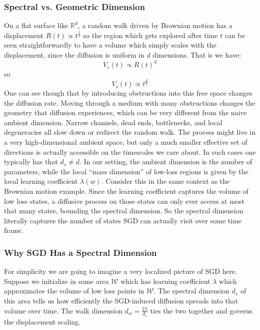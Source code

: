 \documentclass{article} %
\theoremstyle{definition}
\begin{document}
\subsubsection{Spectral vs. Geometric Dimension}
On a flat surface like $\mathbb{R}^d$, a random walk driven by Brownian motion has a displacement $R(t) \propto t^{\frac{1}{2}}$ so the region which gets explored after time $t$ can be seen straightforwardly to have a volume which simply scales with the displacement, since the diffusion is uniform in $d$ dimensions. That is we have:
\begin{equation}
    V_s(t) \propto R(t)^d
\end{equation}
so
\begin{equation}
    V_s(t) \propto t^{\frac{d}{2}}
\end{equation}
One can see though that by introducing obstructions into this free space changes the diffusion rate. Moving through a medium with many obstructions changes the geometry that diffusion experiences, which can be very different from the naive ambient dimension. Narrow channels, dead ends, bottlenecks, and local degeneracies all slow down or redirect the random walk. The process might live in a very high-dimensional ambient space, but only a much smaller effective set of directions is actually accessible on the timescales we care about. In such cases one typically has that $d_s \neq d$. In our setting, the ambient dimension is the number of parameters, while the local “mass dimension” of low-loss regions is given by the local learning coefficient $\lambda(w)$. Consider this in the same context as the Brownian motion example. Since the learning coefficient captures the volume of low loss states, a diffusive process on those states can only ever access at most that many states, bounding the spectral dimension. So the spectral dimension literally captures the number of states SGD can actually visit over some time frame.

\subsubsection{Why SGD Has a Spectral Dimension}
For simplicity we are going to imagine a very localized picture of SGD here. Suppose we initialize in some area $\mathcal{W}$ which has learning coefficient $\lambda$ which approximates the volume of low loss points in $\mathcal{W}$. The spectral dimension $d_s$ of this area tells us how efficiently the SGD-induced diffusion spreads into that volume over time. The walk dimension $d_w = \frac{2\lambda}{d_s}$ ties the two together and governs the displacement scaling.
\end{document}
